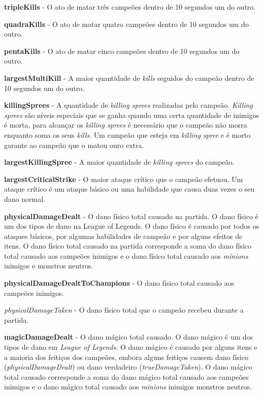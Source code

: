 \textbf{tripleKills} - O ato de matar três campeões dentro de 10 segundos um do outro.

\textbf{quadraKills} - O ato de matar quatro campeões dentro de 10 segundos um do outro.

\textbf{pentaKills} - O ato de matar cinco campeões dentro de 10 segundos um do outro.

\textbf{largestMultiKill} - A maior quantidade de \textit{kills} seguidos do campeão dentro de 10 segundos um do outro.

\textbf{killingSprees} - A quantidade de \textit{killing sprees} realizadas pelo campeão. \textit{Killing sprees} são níveis especiais que se ganha quando uma certa quantidade de inimigos é morta, para alcançar os \textit{killing sprees} é necessário que o campeão não morra enquanto soma os seus \textit{kills}. Um campeão que esteja em \textit{killing spree} e é morto garante ao campeão que o matou ouro extra.

\textbf{largestKillingSpree} - A maior quantidade de \textit{killing sprees} do campeão.

\textbf{largestCriticalStrike} - O maior ataque crítico que o campeão efetuou. Um ataque crítico é um ataque básico ou uma habilidade que causa duas vezes o seu dano normal.

\textbf{physicalDamageDealt} - O dano físico total causado na partida. O dano físico é um dos tipos de dano na League of Legends. O dano físico é causado por todos os ataques básicos, por algumas habilidades de campeão e por alguns efeitos de itens. O dano físico total causado na partida corresponde a soma do dano físico total causado aos campeões inimigos e o dano físico total causado aos \textit{minions} inimigos e monstros neutros.

\textbf{physicalDamageDealtToChampions} - O dano físico total causado aos campeões inimigos.

\textit{physicalDamageTaken} - O dano físico total que o campeão recebeu durante a partida.

\textbf{magicDamageDealt} - O dano mágico total causado. O dano mágico é um dos tipos de dano em \textit{League of Legends}. O dano mágico é causado por alguns itens e a maioria dos feitiços dos campeões, embora alguns feitiços causem dano físico (\textit{physicalDamageDealt}) ou dano verdadeiro (\textit{trueDamageTaken}). O dano mágico total causado corresponde a soma do dano mágico total causado aos campeões inimigos e o dano mágico total causado aos \textit{minions} inimigos monstros neutros.

